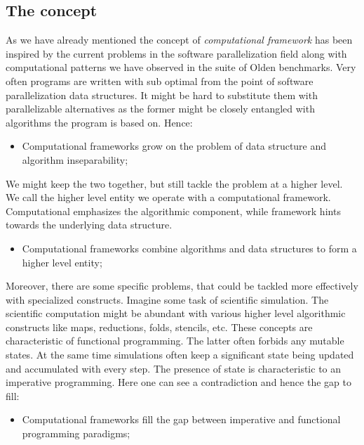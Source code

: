 \subsection{The concept}
\label{frameworks_concept}
\quad As we have already mentioned the concept of \textit{computational framework} has been inspired by the current problems in the software parallelization field along with computational patterns we have observed in the suite of Olden benchmarks. Very often programs are written with sub optimal from the point of software parallelization data structures. It might be hard to substitute them with parallelizable alternatives as the former might be closely entangled with algorithms the program is based on. Hence:
\begin{itemize}[style=unboxed,leftmargin=0cm]
\itemsep0em
\renewcommand\labelitemi{$\vartriangleright$}
\renewcommand\labelitemii{$\bullet$}
\item Computational frameworks grow on the problem of data structure and algorithm inseparability;
\end{itemize}
\quad We might keep the two together, but still tackle the problem at a higher level. We call the higher level entity we operate with a computational framework. Computational emphasizes the algorithmic component, while framework hints towards the underlying data structure. 
\begin{itemize}[style=unboxed,leftmargin=0cm]
\itemsep0em
\renewcommand\labelitemi{$\vartriangleright$}
\renewcommand\labelitemii{$\bullet$}
\item Computational frameworks combine algorithms and data structures to form a higher level entity;
\end{itemize}
\quad Moreover, there are some specific problems, that could be tackled more effectively with specialized constructs. Imagine some task of scientific simulation. The scientific computation might be abundant with various higher level algorithmic constructs like maps, reductions, folds, stencils, etc. These concepts are characteristic of functional programming. The latter often forbids any mutable states. At the same time simulations often keep a significant state being updated and accumulated with every step. The presence of state is characteristic to an imperative programming. Here one can see a contradiction and hence the gap to fill: \begin{itemize}[style=unboxed,leftmargin=0cm]
\itemsep0em
\renewcommand\labelitemi{$\vartriangleright$}
\renewcommand\labelitemii{$\bullet$}
\item Computational frameworks fill the gap between imperative and functional programming paradigms;
\end{itemize}
